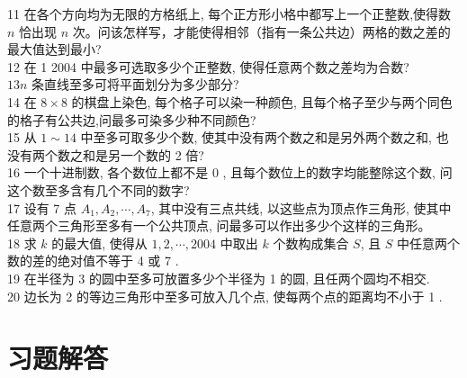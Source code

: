 \documentclass[10pt]{article}
\begin{document}
11 在各个方向均为无限的方格纸上, 每个正方形小格中都写上一个正整数,使得数 $n$ 恰出现 $n$ 次。问该怎样写，才能使得相邻（指有一条公共边）两格的数之差的最大值达到最小?\\
12 在 1 2004 中最多可选取多少个正整数, 使得任意两个数之差均为合数?\\
$13 n$ 条直线至多可将平面划分为多少部分?\\
14 在 $8 \times 8$ 的棋盘上染色, 每个格子可以染一种颜色, 且每个格子至少与两个同色的格子有公共边,问最多可染多少种不同颜色?\\
15 从 $1 \sim 14$ 中至多可取多少个数, 使其中没有两个数之和是另外两个数之和, 也没有两个数之和是另一个数的 2 倍?\\
16 一个十进制数, 各个数位上都不是 0 , 且每个数位上的数字均能整除这个数, 问这个数至多含有几个不同的数字?\\
17 设有 7 点 $A_{1}, A_{2}, \cdots, A_{7}$, 其中没有三点共线, 以这些点为顶点作三角形, 使其中任意两个三角形至多有一个公共顶点, 问最多可以作出多少个这样的三角形。\\
18 求 $k$ 的最大值, 使得从 $1,2, \cdots, 2004$ 中取出 $k$ 个数构成集合 $S$, 且 $S$ 中任意两个数的差的绝对值不等于 4 或 7 .\\
19 在半径为 3 的圆中至多可放置多少个半径为 1 的圆, 且任两个圆均不相交.\\
20 边长为 2 的等边三角形中至多可放入几个点, 使每两个点的距离均不小于 1 .

\section{习题解答}
\end{document}
